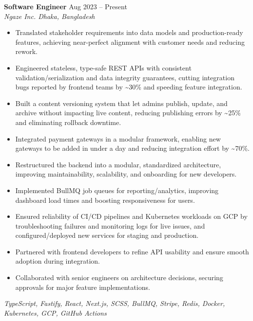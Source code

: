 \documentclass[a4paper,10pt]{article}
\begin{document}
\textbf{Software Engineer} \hfill Aug 2023 -- Present\\[-2pt]
\textit{Ngaze Inc. \textbar{} Dhaka, Bangladesh}\\[-4pt]
\begin{itemize}
  \item Translated stakeholder requirements into data models and production-ready features, achieving near-perfect alignment with customer needs and reducing rework.
  \item Engineered stateless, type-safe REST APIs with consistent validation/serialization and data integrity guarantees, cutting integration bugs reported by frontend teams by \textasciitilde{}30\% and speeding feature integration.
  \item Built a content versioning system that let admins publish, update, and archive without impacting live content, reducing publishing errors by \textasciitilde{}25\% and eliminating rollback downtime.
  \item Integrated payment gateways in a modular framework, enabling new gateways to be added in under a day and reducing integration effort by \textasciitilde{}70\%.
  \item Restructured the backend into a modular, standardized architecture, improving maintainability, scalability, and onboarding for new developers.
  \item Implemented BullMQ job queues for reporting/analytics, improving dashboard load times and boosting responsiveness for users.  
  \item Ensured reliability of CI/CD pipelines and Kubernetes workloads on GCP by troubleshooting failures and monitoring logs for live issues, and configured/deployed new services for staging and production.
  \item Partnered with frontend developers to refine API usability and ensure smooth adoption during integration.
  \item Collaborated with senior engineers on architecture decisions, securing approvals for major feature implementations.
\end{itemize}
\emph{TypeScript, Fastify, React, Next.js, SCSS, BullMQ, Stripe, Redis, Docker, Kubernetes, GCP, GitHub Actions}

\vspace{1pt}
\end{document}
